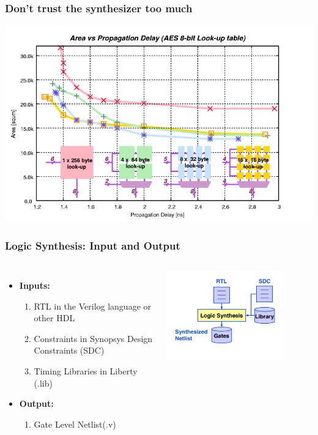 \documentclass[compress]{beamer}
\begin{document}
\begin{frame}
	\frametitle{Don’t trust the synthesizer too much}
	\begin{center}
		\includegraphics[width=\textwidth]{synthesizer4}
	\end{center}
\end{frame}
\begin{frame}
	\frametitle{Logic Synthesis: Input and Output}
		\begin{columns}	
		\begin{itemize}
			\item \textbf{Inputs:} 
			\begin{enumerate}
				\item RTL in the Verilog language or other HDL
				\item Constraints in Synopsys Design Constraints (SDC)
				\item Timing Libraries in Liberty (.lib)
			\end{enumerate}
			\item \textbf{Output:}
			\begin{enumerate}
				\item Gate Level Netlist(.v)
			\end{enumerate}
		\end{itemize}
		\begin{center}
			\includegraphics[width=0.8\textwidth]{inputs_outputs}
		\end{center}
	\end{columns}
\end{frame}
\end{document}
